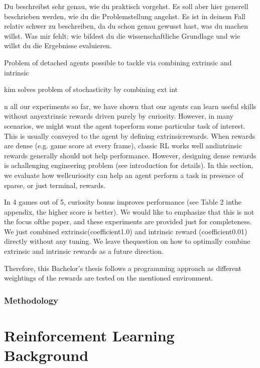 \documentclass[draft,final]{vutinfth} %
\begin{document}
    Du beschreibst sehr genau, wie du praktisch vorgehst. Es soll aber hier generell beschrieben werden, wie du die Problemstellung angehst. Es ist in deinem Fall relativ schwer zu beschreiben, da du schon genau gewusst hast, was du machen willst. Was mir fehlt: wie bildest du die wissenschaftliche Grundlage und wie willst du die Ergebnisse evaluieren.



    Problem of detached agents possible to tackle via combining extrinsic and intrinsic

    kim solves problem of stochasticity by combining ext int


    n all our experiments so far, we have shown that our agents can learn useful skills without anyextrinsic rewards driven purely by curiosity. However, in many scenarios, we might want the agent toperform some particular task of interest. This is usually conveyed to the agent by defining extrinsicrewards. When rewards are dense (e.g. game score at every frame), classic RL works well andintrinsic rewards generally should not help performance. However, designing dense rewards is achallenging engineering problem (see introduction for details). In this section, we evaluate how wellcuriosity can help an agent perform a task in presence of sparse, or just terminal, rewards.

    In 4 games out of 5, curiosity bonus improves performance (see Table 2 inthe appendix, the higher score is better). We would like to emphasize that this is not the focus ofthe paper, and these experiments are provided just for completeness. We just combined extrinsic(coefficient1.0) and intrinsic reward (coefficient0.01) directly without any tuning. We leave thequestion on how to optimally combine extrinsic and intrinsic rewards as a future direction.

    Therefore, this Bachelor's thesis follows a programming approach as different weightings of the rewards are tested on the mentioned environment.

    \subsection{Methodology}


    \glsresetall


    \chapter{Reinforcement Learning Background}\label{ch:reinforcement-learning-background}
\end{document}
